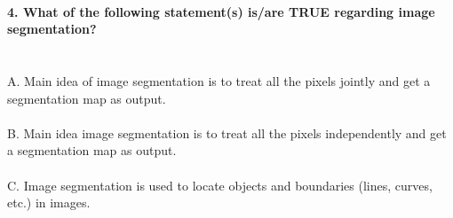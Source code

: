 \documentclass[prl,twocolumn,showpacs,preprintnumbers,superscriptaddress]{revtex4}
\theoremstyle{plain}
\theoremstyle{definition}
\begin{document}
\begin{widetext}
\\
\textbf{4. What of the following statement(s) is/are TRUE regarding image segmentation?}
\\
\\
\\
A. Main idea of image segmentation is to treat all the pixels jointly and get a segmentation map as output.
\\
\\
B. Main idea image segmentation is to treat all the pixels independently and get a segmentation map as output.
\\
\\
C. Image segmentation is  used to locate objects and boundaries (lines, curves, etc.) in images.
\\
\\

\end{widetext}
\end{document}
